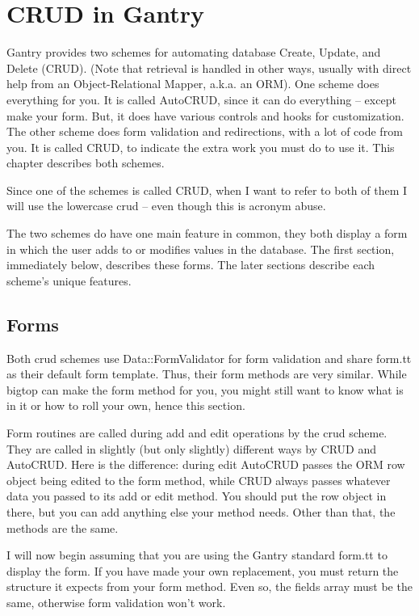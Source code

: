 \chapter{CRUD in Gantry}
\label{chap:fullcrud}

Gantry provides two schemes for automating database Create, Update, and
Delete (CRUD).  (Note that retrieval is handled in other ways, usually with
direct help from an Object-Relational Mapper, a.k.a. an ORM).  One scheme does
everything for you.  It is called AutoCRUD, since it can do everything
-- except make your form.  But, it does have various controls and hooks for
customization.  The other scheme does form validation and redirections, with
a lot of code from you.  It is called CRUD, to indicate the extra work
you must do to use it.  This chapter describes both schemes.

Since one of the schemes is called CRUD, when I want to refer to both of
them I will use the lowercase crud -- even though this is acronym abuse.

The two schemes do have one main feature in common, they both display a
form in which the user adds to or modifies values in the database.  The
first section, immediately below, describes these forms.  The later
sections describe each scheme's unique features.

\section{Forms}

Both crud schemes use Data::FormValidator for form validation and share
form.tt as their default form template.  Thus, their form methods are very
similar.  While bigtop can make the form method for you, you might still
want to know what is in it or how to roll your own, hence this section.

Form routines are called during add and edit operations by the crud scheme.
They are called in slightly (but only slightly) different ways by CRUD and
AutoCRUD.  Here is the difference: during edit AutoCRUD passes the ORM row
object being edited to the form method, while CRUD always passes whatever
data you passed to its add or edit method.  You should put the row object
in there, but you can add anything else your method needs.  Other than that,
the methods are the same.

I will now begin assuming that you are using the Gantry standard form.tt
to display the form.  If you have made your own replacement, you must
return the structure it expects from your form method.  Even so, the fields
array must be the same, otherwise form validation won't work.

